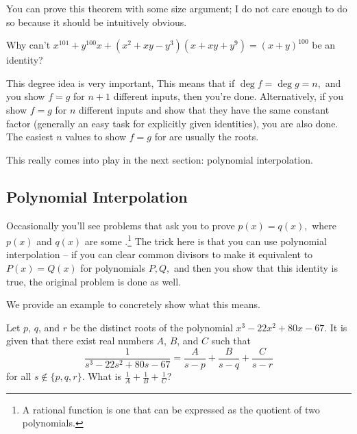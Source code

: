 \documentclass[mast]{lucky}
\begin{document}
You can prove this theorem with some size argument; I do not care enough to do so because it should be intuitively obvious.

\begin{exer}
Why can't $x^{101}+y^{100}x+(x^2+xy-y^3)(x+xy+y^9)=(x+y)^{100}$ be an identity?
\end{exer}

This degree idea is very important,  This means that if $\deg f=\deg g = n,$ and you show $f=g$ for $n+1$ different inputs, then you're done. Alternatively, if you show $f=g$ for $n$ different inputs and show that they have the same constant factor (generally an easy task for explicitly given identities), you are also done. The easiest $n$ values to show $f=g$ for are usually the roots.

This really comes into play in the next section: polynomial interpolation.

\subsection{Polynomial Interpolation}

Occasionally you'll see problems that ask you to prove $p(x)=q(x),$ where $p(x)$ and $q(x)$ are some .\footnote{A rational function is one that can be expressed as the quotient of two polynomials.} The trick here is that you can use polynomial interpolation -- if you can clear common divisors to make it equivalent to $P(x)=Q(x)$ for polynomials $P,Q,$ and then you show that this identity is true, the original problem is done as well.

We provide an example to concretely show what this means.

\begin{exam}[AMC 10A 2019/24]
Let $p$, $q$, and $r$ be the distinct roots of the polynomial $x^3 - 22x^2 + 80x - 67$. It is given that there exist real numbers $A$, $B$, and $C$ such that\[\dfrac{1}{s^3 - 22s^2 + 80s - 67} = \dfrac{A}{s-p} + \dfrac{B}{s-q} + \frac{C}{s-r}\]for all $s\not\in\{p,q,r\}$. What is $\tfrac1A+\tfrac1B+\tfrac1C$?
\end{exam}
\end{document}
